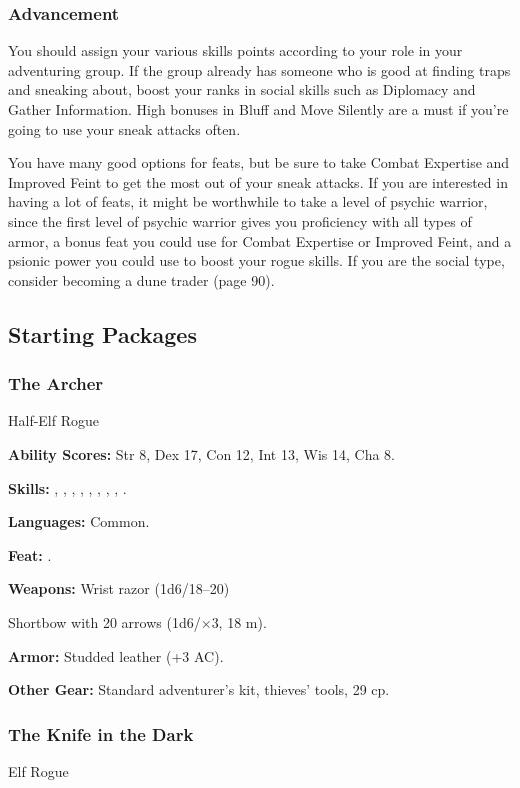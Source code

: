 \subsubsection{Advancement}

You should assign your various skills points according to your role in your adventuring group. If the group already has someone who is good at finding traps and sneaking about, boost your ranks in social skills such as Diplomacy and Gather Information. High bonuses in Bluff and Move Silently are a must if you're going to use your sneak attacks often.

You have many good options for feats, but be sure to take Combat Expertise and Improved Feint to get the most out of your sneak attacks. If you are interested in having a lot of feats, it might be worthwhile to take a level of psychic warrior, since the first level of psychic warrior gives you proficiency with all types of armor, a bonus feat you could use for Combat Expertise or Improved Feint, and a psionic power you could use to boost your rogue skills. If you are the social type, consider becoming a dune trader (page 90).

\vskip3cm
\subsection{Starting Packages}
\subsubsection{The Archer}
Half-Elf Rogue

\textbf{Ability Scores:} Str 8, Dex 17, Con 12, Int 13, Wis 14, Cha 8.

\textbf{Skills:} , , , , , , , , .

\textbf{Languages:} Common.

\textbf{Feat:} .

\textbf{Weapons:} Wrist razor (1d6/18--20)

Shortbow with 20 arrows (1d6/$\times$3, 18 m).

\textbf{Armor:} Studded leather (+3 AC).

\textbf{Other Gear:} Standard adventurer's kit, thieves' tools, 29 cp.

\subsubsection{The Knife in the Dark}
Elf Rogue

